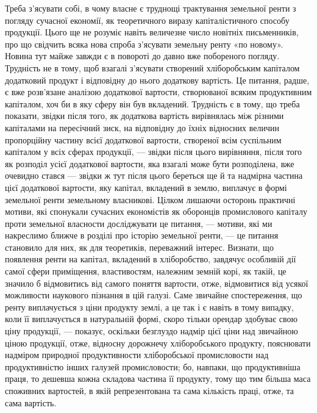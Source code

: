 Треба з’ясувати собі, в чому власне є труднощі трактування земельної
ренти з погляду сучасної економії, як теоретичного виразу капіталістичного
способу продукції. Цього ще не розуміє навіть величезне число новітніх письменників,
про що свідчить всяка нова спроба з’ясувати земельну ренту «по
новому». Новина тут майже завжди є в повороті до давно вже побореного погляду.
Трудність не в тому, щоб взагалі з’ясувати створений хліборобським
капіталом додатковий продукт і відповідну до нього додаткову вартість. Це
питання, радше, є вже розв’язане аналізою додаткової вартости, створюваної
всяким продуктивним капіталом, хоч би в яку сферу він був вкладений. Трудність
є в тому, що треба показати, звідки після того, як додаткова вартість
вирівнялась між різними капіталами на пересічний зиск, на відповідну до
їхніх відносних величин пропорційну частину всієї додаткової вартости, створеної
всім суспільним капіталом у всіх сферах продукції, — звідки після цього вирівняння,
після того як розподіл усієї додаткової вартости, яка взагалі може
бути розподілена, вже очевидно стався — звідки ж тут після цього береться
ще й та надмірна частина цієї додаткової вартости, яку капітал, вкладений
в землю, виплачує в формі земельної ренти земельному власникові.
Цілком лишаючи осторонь практичні мотиви, які спонукали сучасних економістів
як оборонців промислового капіталу проти земельної власности
досліджувати це питання, — мотиви, які ми накреслимо ближче в розділі
про історію земельної ренти, — це питання становило для них, як для теоретиків,
переважний інтерес. Визнати, що появлення ренти на капітал, вкладений
в хліборобство, завдячує особливій дії самої сфери приміщення, властивостям,
належним земній корі, як такій, це значило б відмовитись від самого
поняття вартости, отже, відмовитися від усякої можливости наукового
пізнання в цій галузі. Саме звичайне спостереження, що ренту виплачується
з ціни продукту землі, а це так і є навіть в тому випадку, коли її виплачується
в натуральній формі, скоро тільки орендар здобуває свою ціну продукції,
— показує, оскільки безглуздо надмір цієї ціни над звичайною ціною
продукції, отже, відносну дорожнечу хліборобського продукту, пояснювати надміром
природної продуктивности хліборобської промисловости над продуктивністю
інших галузей промисловости; бо, навпаки, що продуктивніша праця, то
дешевша кожна складова частина її продукту, тому що тим більша маса споживних
вартостей, в якій репрезентована та сама кількість праці, отже, та сама вартість.

